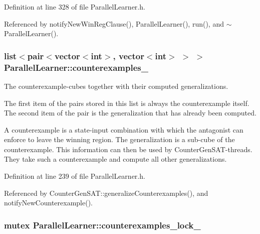 Definition at line 328 of file Parallel\-Learner.\-h.



Referenced by notify\-New\-Win\-Reg\-Clause(), Parallel\-Learner(), run(), and $\sim$\-Parallel\-Learner().

\hypertarget{classParallelLearner_a974943e3e2145b3407f689b64acdd33f}{
\subsubsection[{counterexamples\-\_\-}]{\setlength{\rightskip}{0pt plus 5cm}list$<$pair$<$vector$<$int$>$, vector$<$int$>$ $>$ $>$ Parallel\-Learner\-::counterexamples\-\_\-}}\label{classParallelLearner_a974943e3e2145b3407f689b64acdd33f}


The counterexample-\/cubes together with their computed generalizations. 

The first item of the pairs stored in this list is always the counterexample itself. The second item of the pair is the generalization that has already been computed.

A counterexample is a state-\/input combination with which the antagonist can enforce to leave the winning region. The generalization is a sub-\/cube of the counterexample. This information can then be used by Counter\-Gen\-S\-A\-T-\/threads. They take such a counterexample and compute all other generalizations. 

Definition at line 239 of file Parallel\-Learner.\-h.



Referenced by Counter\-Gen\-S\-A\-T\-::generalize\-Counterexamples(), and notify\-New\-Counterexample().

\hypertarget{classParallelLearner_a454c81908f2d3cb4c24b042739adc4ec}{
\subsubsection[{counterexamples\-\_\-lock\-\_\-}]{\setlength{\rightskip}{0pt plus 5cm}mutex Parallel\-Learner\-::counterexamples\-\_\-lock\-\_\-}}\label{classParallelLearner_a454c81908f2d3cb4c24b042739adc4ec}


